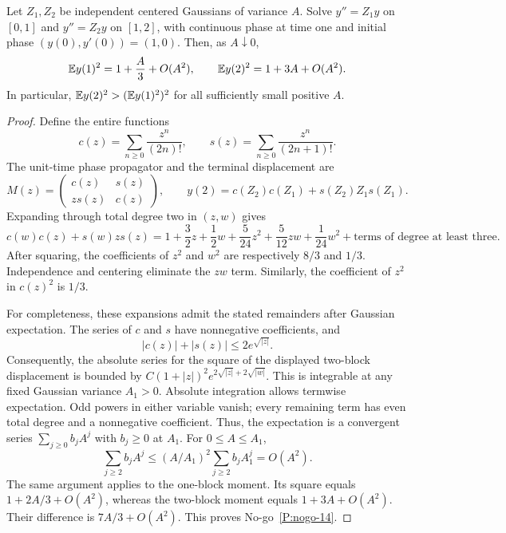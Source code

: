 \setcounter{nogo}{13}
\begin{nogo}
  \label{P:nogo-14}
  Let $Z_1,Z_2$ be independent centered Gaussians of variance $A$. Solve
  $y''=Z_1y$ on $[0,1]$ and $y''=Z_2y$ on $[1,2]$, with continuous phase
  at time one and initial phase $(y(0),y'(0))=(1,0)$. Then, as
  $A\downarrow0$,
  \[
    \mathbb{E} y(1)^2=1+\frac A3+O(A^2),\qquad
    \mathbb{E} y(2)^2=1+3A+O(A^2).
  \]
  In particular, $\mathbb{E} y(2)^2>(\mathbb{E} y(1)^2)^2$ for all sufficiently small
  positive $A$.
\end{nogo}
\begin{proof}
  Define the entire functions
  \[
    c(z)=\sum_{n\ge0}\frac{z^n}{(2n)!},\qquad
    s(z)=\sum_{n\ge0}\frac{z^n}{(2n+1)!}.
  \]
  The unit-time phase propagator and the terminal displacement are
  \[
    M(z)=\begin{pmatrix}c(z)&s(z)\\zs(z)&c(z)\end{pmatrix},\qquad
    y(2)=c(Z_2)c(Z_1)+s(Z_2)Z_1s(Z_1).
  \]
  Expanding through total degree two in $(z,w)$ gives
  \[
    c(w)c(z)+s(w)zs(z)
    =1+\frac32z+\frac12w
    +\frac5{24}z^2+\frac5{12}zw+\frac1{24}w^2
    +\text{terms of degree at least three}.
  \]
  After squaring, the coefficients of $z^2$ and $w^2$ are respectively
  $8/3$ and $1/3$. Independence and centering eliminate the $zw$ term.
  Similarly, the coefficient of $z^2$ in $c(z)^2$ is $1/3$.

  For completeness, these expansions admit the stated remainders after
  Gaussian expectation. The series of $c$ and $s$ have nonnegative
  coefficients, and
  \[
    |c(z)|+|s(z)|\le2e^{\sqrt{|z|}}.
  \]
  Consequently, the absolute series for the square of the displayed
  two-block displacement is bounded by
  $C(1+|z|)^2e^{2\sqrt{|z|}+2\sqrt{|w|}}$.
  This is integrable at any fixed Gaussian variance $A_1>0$. Absolute
  integration allows termwise expectation. Odd powers in either variable
  vanish; every remaining term has even total degree and a nonnegative
  coefficient. Thus, the expectation is a convergent series
  $\sum_{j\ge0}b_jA^j$ with $b_j\ge0$ at $A_1$. For $0\le A\le A_1$,
  \[
    \sum_{j\ge2}b_jA^j
    \le (A/A_1)^2\sum_{j\ge2}b_jA_1^j=O(A^2).
  \]
  The same argument applies to the one-block moment. Its square equals
  $1+2A/3+O(A^2)$, whereas the two-block moment equals
  $1+3A+O(A^2)$. Their difference is $7A/3+O(A^2)$.
  This proves No-go~\ref{P:nogo-14}.
\end{proof}

